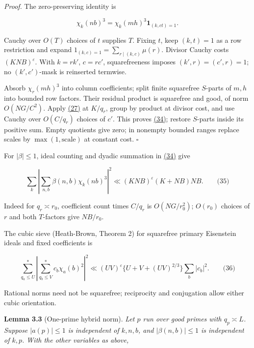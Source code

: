 \emph{Proof.} The zero-preserving identity is

\[
\chi_k(nb)^3=\chi_k(mh)^3\mathbf1_{(k,ct)=1}.
\]

Cauchy over \(O(T)\) choices of \(t\) supplies \(T\). Fixing \(t\), keep \((k,t)=1\) as a row restriction and expand \(1_{(k,c)=1}=\sum_{r\mid(k,c)}\mu(r)\). Divisor Cauchy costs \((KNB)^\varepsilon\). With \(k=rk'\), \(c=rc'\), squarefreeness imposes \((k',r)=(c',r)=1\); no \((k',c')\)-mask is reinserted termwise.

Absorb \(\chi_r(mh)^3\) into column coefficients; split finite squarefree \(S\)-parts of \(m,h\) into bounded row factors. Their residual product is squarefree and good, of norm \(O(NG/C^2)\). Apply \protect\hyperlink{cf:eq:B.11}{(27)} at \(K/q_r\), group by product at divisor cost, and use Cauchy over \(O(C/q_r)\) choices of \(c'\). This proves \protect\hyperlink{cf:eq:B.17}{(34)}; restore \(S\)-parts inside its positive sum. Empty quotients give zero; in nonempty bounded ranges replace scales by \(\max(1,\text{scale})\) at constant cost. \(\square\)

For \(|\beta|\le1\), ideal counting and dyadic summation in \protect\hyperlink{cf:eq:B.17}{(34)} give

\hypertarget{cf:eq:B.18}{}

\label{cf:eq:B.18}

\[
\sum_k\left|\sum_{n,b}\beta(n,b)\chi_k(nb)^3\right|^2
\ll(KNB)^\varepsilon(K+NB)NB.
\qquad\text{(35)}
\]

Indeed for \(q_r\asymp r_0\), coefficient count times \(C/q_r\) is \(O(NG/r_0^2)\); \(O(r_0)\) choices of \(r\) and both \(T\)-factors give \(NB/r_0\).

The cubic sieve (Heath-Brown, Theorem 2) for squarefree primary Eisenstein ideals and fixed coefficients is

\hypertarget{cf:eq:B.19}{}

\label{cf:eq:B.19}

\[
\sum_{q_a\le U}^{*}\left|\sum_{q_b\le V}^{*}c_b\chi_a(b)^2\right|^2
 \ll(UV)^\varepsilon\{U+V+(UV)^{2/3}\}\sum_b|c_b|^2.
\qquad\text{(36)}
\]

Rational norms need not be squarefree; reciprocity and conjugation allow either cubic orientation.

\textbf{Lemma 3.3} (One-prime hybrid norm). \emph{\hypertarget{cf:hybrid-norm}{}\label{cf:hybrid-norm} Let \(p\) run over good primes with \(q_p\asymp L\). Suppose \(|a(p)|\le1\) is independent of \(k,n,b\), and \(|\beta(n,b)|\le1\) is independent of \(k,p\). With the other variables as above, \hypertarget{cf:eq:B.20}{}\label{cf:eq:B.20}}

